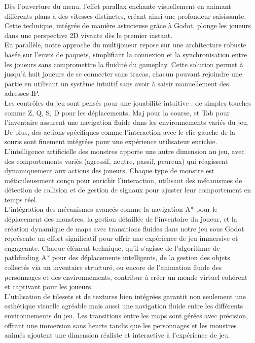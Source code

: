 Dès l'ouverture du menu, l'effet parallax enchante visuellement en animant différents plans à des vitesses distinctes,
créant ainsi une profondeur saisissante. Cette technique, intégrée de manière astucieuse grâce à Godot, plonge les joueurs dans une perspective 2D
vivante dès le premier instant.
\\

En parallèle, notre approche du multijoueur repose sur une architecture robuste basée sur l'envoi de paquets, simplifiant
la connexion et la synchronisation entre les joueurs sans compromettre la fluidité du gameplay. Cette solution permet à jusqu'à huit joueurs
de se connecter sans tracas, chacun pouvant rejoindre une partie en utilisant un système intuitif sans avoir à saisir manuellement des adresses IP.
\\

Les contrôles du jeu sont pensés pour une jouabilité intuitive : de simples touches comme Z, Q, S, D pour les déplacements, Maj pour la course,
et Tab pour l'inventaire assurent une navigation fluide dans les environnements variés du jeu. De plus, des actions spécifiques comme l'interaction
avec le clic gauche de la souris sont finement intégrées pour une expérience utilisateur enrichie.
\\

L'intelligence artificielle des monstres apporte une autre dimension au jeu, avec des comportements variés (agressif, neutre, passif, peureux) qui
réagissent dynamiquement aux actions des joueurs. Chaque type de monstre est méticuleusement conçu pour enrichir l'interaction, utilisant des mécanismes
de détection de collision et de gestion de signaux pour ajuster leur comportement en temps réel.
\\



L'intégration des mécanismes avancés comme la navigation A* pour le déplacement des monstres, la gestion détaillée de l'inventaire du joueur, et la
création dynamique de maps avec transitions fluides dans notre jeu sous Godot représente un effort significatif pour offrir une expérience de jeu
immersive et engageante. Chaque élément technique, qu'il s'agisse de l'algorithme de pathfinding A* pour des déplacements intelligents,
de la gestion des objets collectés via un inventaire structuré, ou encore de l'animation fluide des
personnages et des environnements, contribue à créer un monde virtuel cohérent et captivant pour les joueurs.
\\

L'utilisation de tilesets et de textures bien intégrées garantit non seulement une esthétique visuelle agréable
mais aussi une navigation fluide entre les différents environnements du jeu. Les transitions entre les maps sont gérées
avec précision, offrant une immersion sans heurts tandis que les personnages et les monstres animés ajoutent une dimension réaliste et interactive à l'expérience de jeu.
\\


